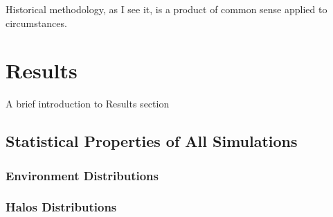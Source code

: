 

\begin{savequote}[50mm]
Historical methodology, as I see it, is a product of common sense applied to circumstances. 
\end{savequote}

\chapter{Results}
\label{cha:Results}

\ifpdf
    \graphicspath{{3_overall_methodology/figures/PNG/}{3_overall_methodology/figures/PDF/}{3_overall_methodology/figures/}}
\else
    \graphicspath{{3_overall_methodology/figures/EPS/}{3_overall_methodology/figures/}}
\fi


A brief introduction to Results section



\section{Statistical Properties of All Simulations}
\label{sec:StatisticalPropertiesOfAllSimulations}


	\subsection{Environment Distributions}
	\label{subsec:EnvironmentDistributions}


	\subsection{Halos Distributions}
	\label{subsec:HalosDistributions}


